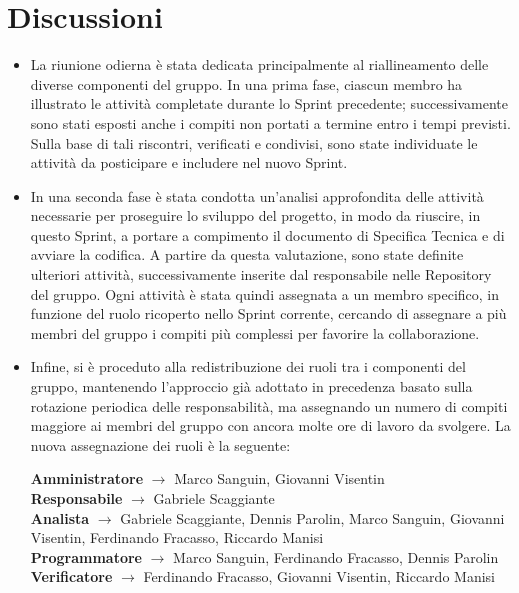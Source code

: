 \documentclass[a4paper,12pt]{article}
\begin{document}
\section{Discussioni}
\begin{itemize}
    \item La riunione odierna è stata dedicata principalmente al riallineamento delle diverse componenti del gruppo. In una prima fase, ciascun membro ha illustrato le attività completate durante lo Sprint precedente; successivamente sono stati esposti anche i compiti non portati a termine entro i tempi previsti. Sulla base di tali riscontri, verificati e condivisi, sono state individuate le attività da posticipare e includere nel nuovo Sprint.
    \item In una seconda fase è stata condotta un’analisi approfondita delle attività necessarie per proseguire lo sviluppo del progetto, in modo da riuscire, in questo Sprint, a portare a compimento il documento di Specifica Tecnica e di avviare la codifica. A partire da questa valutazione, sono state definite ulteriori attività, successivamente inserite dal responsabile nelle Repository del gruppo. Ogni attività è stata quindi assegnata a un membro specifico, in funzione del ruolo ricoperto nello Sprint corrente, cercando di assegnare a più membri del gruppo i compiti più complessi per favorire la collaborazione.
    \item Infine, si è proceduto alla redistribuzione dei ruoli tra i componenti del gruppo, mantenendo l’approccio già adottato in precedenza basato sulla rotazione periodica delle responsabilità, ma assegnando un numero di compiti maggiore ai membri del gruppo con ancora molte ore di lavoro da svolgere. La nuova assegnazione dei ruoli è la seguente:
    \begin{center}
        \textbf{Amministratore} $\rightarrow$ Marco Sanguin, Giovanni Visentin\\
        \textbf{Responsabile} $\rightarrow$ Gabriele Scaggiante\\
        \textbf{Analista} $\rightarrow$ Gabriele Scaggiante, Dennis Parolin, Marco Sanguin, Giovanni Visentin, Ferdinando Fracasso, Riccardo Manisi\\
        \textbf{Programmatore} $\rightarrow$ Marco Sanguin, Ferdinando Fracasso, Dennis Parolin\\
        \textbf{Verificatore} $\rightarrow$ Ferdinando Fracasso, Giovanni Visentin, Riccardo Manisi
    \end{center}
\end{itemize}
\end{document}
